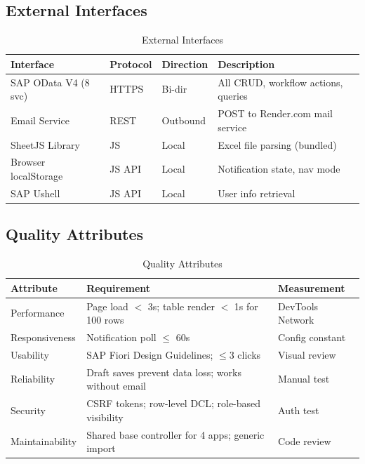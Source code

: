 \documentclass[12pt,a4paper]{report}
\begin{document}
\subsection{External Interfaces}

\begin{table}[H]
\centering\small
\begin{tabularx}{\textwidth}{|l|l|l|X|}
  \hline
  \rowcolor{tableheadpeach}
  \textbf{Interface} & \textbf{Protocol} & \textbf{Direction} & \textbf{Description} \\ \hline
  SAP OData V4 (8 svc) & HTTPS   & Bi-dir   & All CRUD, workflow actions, queries \\ \hline
  Email Service         & REST    & Outbound & POST to Render.com mail service \\ \hline
  SheetJS Library       & JS      & Local    & Excel file parsing (bundled) \\ \hline
  Browser localStorage  & JS API  & Local    & Notification state, nav mode \\ \hline
  SAP Ushell            & JS API  & Local    & User info retrieval \\ \hline
\end{tabularx}
\caption{External Interfaces}
\label{tab:external-interfaces}
\end{table}

\subsection{Quality Attributes}

\begin{table}[H]
\centering\small
\begin{tabularx}{\textwidth}{|l|X|X|}
  \hline
  \rowcolor{tableheadpeach}
  \textbf{Attribute} & \textbf{Requirement} & \textbf{Measurement} \\ \hline
  Performance    & Page load $<$ 3s; table render $<$ 1s for 100 rows    & DevTools Network \\ \hline
  Responsiveness & Notification poll $\leq$ 60s                          & Config constant \\ \hline
  Usability      & SAP Fiori Design Guidelines; $\leq$3 clicks           & Visual review \\ \hline
  Reliability    & Draft saves prevent data loss; works without email     & Manual test \\ \hline
  Security       & CSRF tokens; row-level DCL; role-based visibility      & Auth test \\ \hline
  Maintainability& Shared base controller for 4 apps; generic import     & Code review \\ \hline
\end{tabularx}
\caption{Quality Attributes}
\label{tab:quality-attributes}
\end{table}
\end{document}
